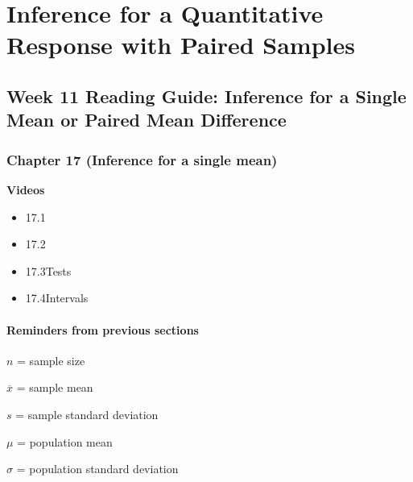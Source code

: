 \documentclass[
]{report}
\providecommand{\tightlist}{%
  \setlength{\itemsep}{0pt}\setlength{\parskip}{0pt}}
\begin{document}
\newpage

\hypertarget{inference-for-a-quantitative-response-with-paired-samples}{%
\chapter{Inference for a Quantitative Response with Paired Samples}\label{inference-for-a-quantitative-response-with-paired-samples}}

\hypertarget{week-11-reading-guide-inference-for-a-single-mean-or-paired-mean-difference}{%
\section{Week 11 Reading Guide: Inference for a Single Mean or Paired Mean Difference}\label{week-11-reading-guide-inference-for-a-single-mean-or-paired-mean-difference}}

\hypertarget{chapter-17-inference-for-a-single-mean}{%
\subsection*{Chapter 17 (Inference for a single mean)}\label{chapter-17-inference-for-a-single-mean}}

\textbf{Videos}

\begin{itemize}
\tightlist
\item
  17.1
\item
  17.2
\item
  17.3Tests
\item
  17.4Intervals
\end{itemize}


\hypertarget{reminders-from-previous-sections-9}{%
\subsubsection*{Reminders from previous sections}\label{reminders-from-previous-sections-9}}

\(n\) = sample size

\(\overline{x}\) = sample mean

\(s\) = sample standard deviation

\(\mu\) = population mean

\(\sigma\) = population standard deviation
\end{document}
